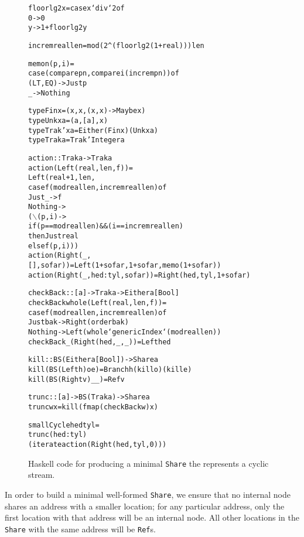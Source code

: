 \documentclass[envcountsect]{llncs}
\newcommand{\share}{{\tt Share} }
\begin{document}
\begin{figure}
\begin{alltt}
floorlg2 x = case x `div` 2 of
               0 -> 0
               y -> 1 + floorlg2 y

increm real len = mod (2^(floorlg2 (1+real))) len

memo n (p,i) =
    case (compare p n, compare i (increm p n)) of
      (LT,EQ) -> Just p
      _ -> Nothing

type Fin x = (x,x,(x,x) -> Maybe x)
type Unk x a = (a,[a],x)
type Trak' x a = Either (Fin x) (Unk x a)
type Trak a = Trak' Integer a

action :: Trak a -> Trak a
action (Left (real,len,f)) =
    Left (real+1,len,
          case f (mod real len, increm real len) of
            Just _ -> f
            Nothing -> 
                (\(\backslash\)(p,i) ->
                 if (p == mod real len) && (i == increm real len)
                 then Just real
                 else f (p,i)))
action (Right (_,[],sofar)) = Left (1+sofar,1+sofar,memo (1+sofar))
action (Right (_,hed:tyl,sofar)) = Right (hed,tyl,1+sofar)

checkBack :: [a] -> Trak a -> Either a [Bool]
checkBack whole (Left (real,len,f)) =
    case f (mod real len,increm real len) of
      Just bak -> Right (order bak)
      Nothing -> Left (whole `genericIndex` (mod real len)) 
checkBack _ (Right (hed,_,_)) = Left hed

kill :: BS (Either a [Bool]) -> Share a
kill (BS (Left h) o e) = Branch h (kill o) (kill e)
kill (BS (Right v) _ _) = Ref v
    
trunc :: [a] -> BS (Trak a) -> Share a
trunc w x = kill (fmap (checkBack w) x)

smallCycle hed tyl =
  trunc (hed:tyl)
    (iterate action (Right (hed,tyl,0)))
\end{alltt}
\caption{Haskell code for producing a minimal \share the represents a cyclic stream.}
\label{cycleDetails}
\end{figure}

In order to build a minimal well-formed {\tt Share}, we ensure that no internal node shares an address with a smaller location;
for any particular address, only the first location with that address will be an internal node.
All other locations in the \share with the same address will be {\tt Ref}s.
\end{document}
